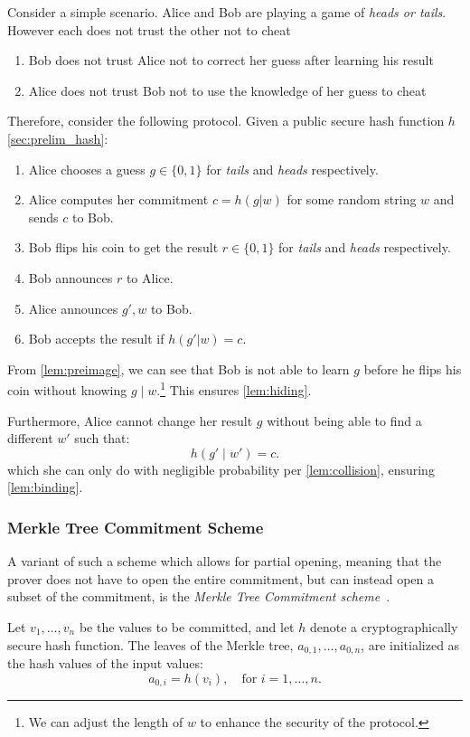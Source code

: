 \documentclass[twoside,11pt]{report}
\theoremstyle{definition}
\theoremstyle{plain}
\begin{document}
Consider a simple scenario. Alice and Bob are playing a game of \textit{heads or tails}. However each does not trust the other not to cheat
\begin{enumerate}[parsep=0pt, itemsep=0pt]
  \item Bob does not trust Alice not to correct her guess after learning his result
  \item Alice does not trust Bob not to use the knowledge of her guess to cheat
\end{enumerate}
Therefore, consider the following protocol. Given a public secure hash function $h$ \autoref{sec:prelim_hash}:
\begin{enumerate}[parsep=0pt, itemsep=0pt]
  \item Alice chooses a guess $g \in \{0,1\}$ for \textit{tails} and \textit{heads} respectively.
  \item Alice computes her commitment $c = h(g | w)$ for some random string $w$ and sends $c$ to Bob.
  \item Bob flips his coin to get the result $r \in \{0,1\}$ for \textit{tails} and \textit{heads} respectively.
  \item Bob announces $r$ to Alice.
  \item Alice announces $g', w$ to Bob.
  \item Bob accepts the result if $h(g' | w) = c$.
\end{enumerate}

From \autoref{lem:preimage}, we can see that Bob is not able to learn $g$ before he flips his coin without knowing $g \mid w$.\footnote{We can adjust the length of $w$ to enhance the security of the protocol.} This ensures \autoref{lem:hiding}.

Furthermore, Alice cannot change her result $g$ without being able to find a different $w'$ such that:
\[
  h(g' \mid w') = c.
\]
which she can only do with negligible probability per \autoref{lem:collision}, ensuring \autoref{lem:binding}.

\subsubsection{Merkle Tree Commitment Scheme}
A variant of such a scheme which allows for partial opening, meaning that the prover does not have to open the entire commitment, but can instead open a subset of the commitment, is the \textit{Merkle Tree Commitment scheme}~\cite{becker2008merkle}.

Let $v_1, \dots, v_n$ be the values to be committed, and let $h$ denote a cryptographically secure hash function. The leaves of the Merkle tree, $a_{0,1}, \dots, a_{0,n}$, are initialized as the hash values of the input values:
\[
  a_{0,i} = h(v_i), \quad \text{for } i = 1, \dots, n.
\]
\end{document}
